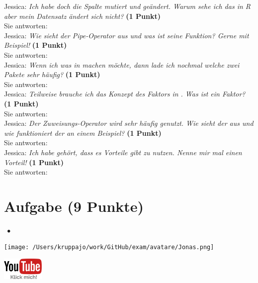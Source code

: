 \documentclass[a4paper, 9pt]{scrartcl}\usepackage[]{graphicx}\usepackage[]{xcolor}
\begin{document}
Jessica: \textit{Ich habe doch die Spalte mutiert und geändert. Warum sehe ich das in R aber mein Datensatz ändert sich nicht?} \textbf{(1 Punkt)}\\[1ex]
Sie antworten:\\[3Ex]

Jessica: \textit{Wie sieht der Pipe-Operator aus und was ist seine Funktion? Gerne mit Beispiel!} \textbf{(1 Punkt)}\\[1ex]
Sie antworten:\\[3Ex]

Jessica: \textit{Wenn ich was in \Rlogo machen möchte, dann lade ich nochmal welche zwei \Rlogo Pakete sehr häufig?} \textbf{(1 Punkt)}\\[1ex]
Sie antworten:\\[3Ex]

Jessica: \textit{Teilweise brauche ich das Konzept des Faktors in \Rlogo. Was ist ein Faktor?} \textbf{(1 Punkt)}\\[1ex]
Sie antworten:\\[3Ex]

Jessica: \textit{Der Zuweisungs-Operator wird sehr häufig genutzt. Wie sieht der aus und wie funktioniert der an einem Beispiel?} \textbf{(1 Punkt)}\\[1ex]
Sie antworten:\\[3Ex]

Jessica: \textit{Ich habe gehört, dass es Vorteile gibt \Rlogo zu nutzen. Nenne mir mal einen Vorteil!} \textbf{(1 Punkt)}\\[1ex]
Sie antworten:\\[3Ex] 
\clearpage

\section{Aufgabe \hfill (9 Punkte)}



 
\ifcollection
\begin{flushright}
\tiny\vspace{-3Ex}
\textbf{\examinhaltstart}
\exammodulestatversuch $\;\bullet$
\exammodulebiostat
\vspace{-4Ex}
\end{flushright}
\begin{minipage}[t]{0.5\textwidth}
\texttt{[image: /Users/kruppajo/work/GitHub/exam/avatare/Jonas.png]}
\end{minipage}
\begin{minipage}[t]{0.5\textwidth}
\hfill
\href{https://www.youtube.com/playlist?list=PLe51bCp9JvEFUnFqaJG5aRmON9i1ZbOYC}{\includegraphics[width = 2cm]{img/youtube}}
\end{minipage}
\vspace{1ex}
\fi
\end{document}
